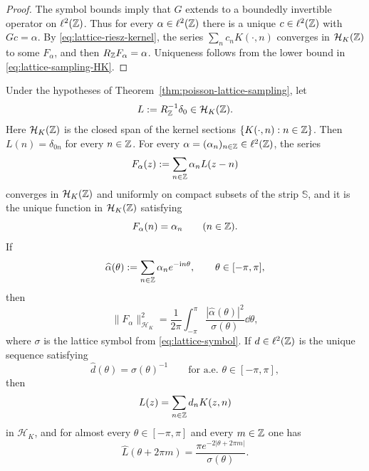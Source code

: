 \begin{proof}
The symbol bounds imply that $G$ extends to a boundedly invertible
operator on $\ell^2(\mathbb{Z})$.  Thus for every $\alpha\in\ell^2(\mathbb{Z})$ there is
a unique $c\in\ell^2(\mathbb{Z})$ with $Gc=\alpha$.  By
\eqref{eq:lattice-riesz-kernel}, the series $\sum_n c_nK(\cdot,n)$
converges in $\mathcal H_K(\mathbb{Z})$ to some $F_\alpha$, and then
$R_{\mathbb{Z}}F_\alpha=\alpha$.  Uniqueness follows from the lower bound in
\eqref{eq:lattice-sampling-HK}.
\end{proof}

\begin{theorem}%
\label{thm:poisson-cardinal-reconstruction}
Under the hypotheses of Theorem~\ref{thm:poisson-lattice-sampling}, let
\[
L:=R_{\mathbb{Z}}^{-1}\delta_0\in\mathcal H_K(\mathbb{Z}).
\]
Here $\mathcal H_K(\mathbb{Z})$ is the closed span of the kernel sections
$\{K(\cdot,n):n\in\mathbb{Z}\}$.
Then $L(n)=\delta_{0n}$ for every $n\in\mathbb{Z}$.  For every
$\alpha=(\alpha_n)_{n\in\mathbb{Z}}\in\ell^2(\mathbb{Z})$, the series
\[
F_\alpha(z):=\sum_{n\in\mathbb{Z}}\alpha_nL(z-n)
\]
converges in $\mathcal H_K(\mathbb{Z})$ and uniformly on compact subsets of the
strip $\mathbb S$, and it is the unique function in $\mathcal H_K(\mathbb{Z})$
satisfying
\[
F_\alpha(n)=\alpha_n
\qquad(n\in\mathbb{Z}).
\]
If
\[
\widehat\alpha(\theta):=\sum_{n\in\mathbb{Z}}\alpha_ne^{-\mathrm{i} n\theta},
\qquad \theta\in[-\pi,\pi],
\]
then
\begin{equation}\label{eq:cardinal-norm-formula}
\|F_\alpha\|_{\mathcal H_K}^2
=\frac{1}{2\pi}\int_{-\pi}^{\pi}
\frac{|\widehat\alpha(\theta)|^2}{\sigma(\theta)}\dd\theta,
\end{equation}
where $\sigma$ is the lattice symbol from \eqref{eq:lattice-symbol}.  If
$d\in\ell^2(\mathbb{Z})$ is the unique sequence satisfying
\[
\widehat d(\theta)=\sigma(\theta)^{-1}
\qquad\text{for a.e. }\theta\in[-\pi,\pi],
\]
then
\[
L(z)=\sum_{n\in\mathbb{Z}}d_nK(z,n)
\]
in $\mathcal H_K$, and for almost every $\theta\in[-\pi,\pi]$ and every
$m\in\mathbb{Z}$ one has
\begin{equation}\label{eq:cardinal-kernel-fourier}
\widehat L(\theta+2\pi m)
=\frac{\pi e^{-2|\theta+2\pi m|}}{\sigma(\theta)}.
\end{equation}
\end{theorem}

